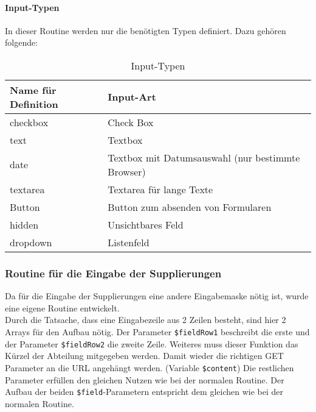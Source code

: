 \paragraph{Input-Typen} \label{sec:content_imple_input_type}
$~~$ \\
In dieser Routine werden nur die benötigten Typen definiert. Dazu gehören folgende:
\begin{table}[H]
\centering
\begin{tabular}{p{4.5 cm}p{10.5 cm}}
   \toprule
   \textbf{Name für Definition} & \textbf{Input-Art} \\
   \midrule
          checkbox & Check Box  \\
          \hline
          text & Textbox \\
          \hline
          date & Textbox mit Datumsauswahl (nur bestimmte Browser) \\
          \hline
          textarea & Textarea für lange Texte\\
          \hline
          Button & Button zum absenden von Formularen\\
          \hline
          hidden & Unsichtbares Feld \\
          \hline
          dropdown & Listenfeld \\
   \bottomrule
\end{tabular}
\caption{Input-Typen}
\end{table}
\subsubsection{Routine für die Eingabe der Supplierungen}
Da für die Eingabe der Supplierungen eine andere Eingabemaske nötig ist, wurde eine eigene Routine entwickelt.\\
Durch die Tatsache, dass eine Eingabezeile aus 2 Zeilen besteht, sind hier 2 Arrays für den Aufbau nötig. Der Parameter \texttt{\$fieldRow1} beschreibt die erste und der Parameter \texttt{\$fieldRow2} die zweite Zeile. Weiteres muss dieser Funktion das Kürzel der Abteilung mitgegeben werden. Damit wieder die richtigen GET Parameter an die URL angehängt werden. (Variable \texttt{\$content}) Die restlichen Parameter erfüllen den gleichen Nutzen wie bei der normalen Routine. Der Aufbau der beiden \texttt{\$field}-Parametern entspricht dem gleichen wie bei der normalen Routine.\\
